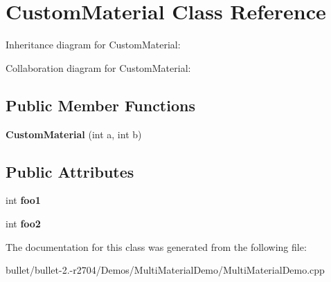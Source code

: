 \hypertarget{class_custom_material}{\section{Custom\+Material Class Reference}
\label{class_custom_material}
}


Inheritance diagram for Custom\+Material\+:


Collaboration diagram for Custom\+Material\+:
\subsection*{Public Member Functions}
\begin{DoxyCompactItemize}
\item 
\hypertarget{class_custom_material_af9aecdf40f2678afcf685d54d87b444b}{{\bfseries Custom\+Material} (int a, int b)}\label{class_custom_material_af9aecdf40f2678afcf685d54d87b444b}

\end{DoxyCompactItemize}
\subsection*{Public Attributes}
\begin{DoxyCompactItemize}
\item 
\hypertarget{class_custom_material_a225cd73b1b076167d5b3f7b3a12f27d7}{int {\bfseries foo1}}\label{class_custom_material_a225cd73b1b076167d5b3f7b3a12f27d7}

\item 
\hypertarget{class_custom_material_ae48cf64517bcad5eefe4b347b570aa42}{int {\bfseries foo2}}\label{class_custom_material_ae48cf64517bcad5eefe4b347b570aa42}

\end{DoxyCompactItemize}


The documentation for this class was generated from the following file\+:\begin{DoxyCompactItemize}
\item 
bullet/bullet-\/2.-\/r2704/\+Demos/\+Multi\+Material\+Demo/Multi\+Material\+Demo.\+cpp\end{DoxyCompactItemize}
